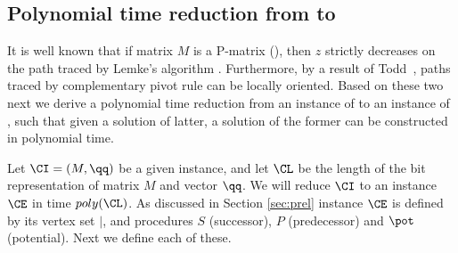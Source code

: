 


\subsection{Polynomial time reduction from \PLCP to \EOPL}

It is well known that if matrix $M$ is a P-matrix (\PLCP), then $z$ strictly
decreases on the path traced by Lemke's algorithm \cite{cottle2009linear}.
Furthermore, by a result of Todd~\cite{todd1976orientation}, paths traced by
complementary pivot rule can be locally oriented.  Based on these two next we
derive a polynomial time reduction from an instance of \PLCP to an instance of
\EOPL, such that given a solution of latter, a solution of the former can be
constructed in polynomial time. 

Let $\CI=(M,\qq)$ be a given \PLCP instance, and let $\CL$ be the length of the bit representation of matrix $M$ and vector $\qq$. 
We will reduce $\CI$ to an \EOPL instance $\CE$ in time $poly(\CL)$. As discussed in Section \ref{sec:prel} instance $\CE$ is defined by its vertex set $\vert$, and procedures $S$ (successor), $P$ (predecessor) and $\pot$ (potential). Next we define each of these. 

